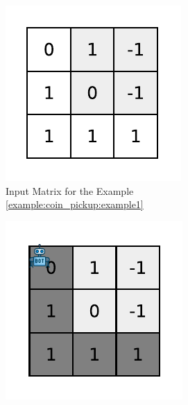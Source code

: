 \begin{figure}
	\centering
	\begin{subfigure}[t]{0.3\textwidth}
		\includegraphics[width=1\linewidth]{sources/coin_pickup/images/example1_0}
		\caption{Input Matrix for the Example \ref{example:coin_pickup:example1}}
		\label{fig:coin_pickup:example_1_0}
	 \end{subfigure}
	\hfill
	\begin{subfigure}[t]{0.3\textwidth}
		\includegraphics[width=1\linewidth]{sources/coin_pickup/images/example1_1}

\end{subfigure}
\end{figure}
